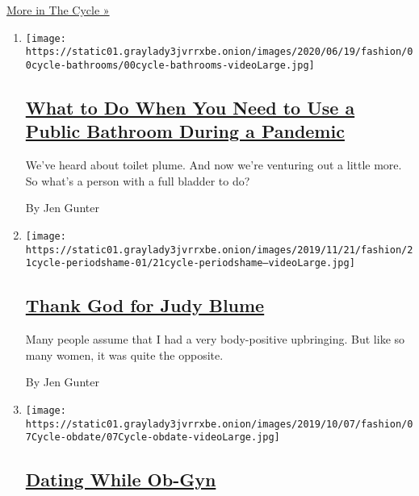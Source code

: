 \href{/column/the-cycle}{More in The Cycle »}

\begin{enumerate}
\def\labelenumi{\arabic{enumi}.}
\item
  \texttt{[image: https://static01.graylady3jvrrxbe.onion/images/2020/06/19/fashion/00cycle-bathrooms/00cycle-bathrooms-videoLarge.jpg]}

  \hypertarget{what-to-do-when-you-need-to-use-a-public-bathroom-during-a-pandemic}{%
  \subsection{\texorpdfstring{\href{/2020/06/24/style/coronavirus-public-bathrooms.html}{What
  to Do When You Need to Use a Public Bathroom During a
  Pandemic}}{What to Do When You Need to Use a Public Bathroom During a Pandemic}}\label{what-to-do-when-you-need-to-use-a-public-bathroom-during-a-pandemic}}

  We've heard about toilet plume. And now we're venturing out a little
  more. So what's a person with a full bladder to do?

  By Jen Gunter
\item
  \texttt{[image: https://static01.graylady3jvrrxbe.onion/images/2019/11/21/fashion/21cycle-periodshame-01/21cycle-periodshame--videoLarge.jpg]}

  \hypertarget{thank-god-for-judy-blume}{%
  \subsection{\texorpdfstring{\href{/2019/11/21/style/menstrual-diarrhea-happens.html}{Thank
  God for Judy
  Blume}}{Thank God for Judy Blume}}\label{thank-god-for-judy-blume}}

  Many people assume that I had a very body-positive upbringing. But
  like so many women, it was quite the opposite.

  By Jen Gunter
\item
  \texttt{[image: https://static01.graylady3jvrrxbe.onion/images/2019/10/07/fashion/07Cycle-obdate/07Cycle-obdate-videoLarge.jpg]}

  \hypertarget{dating-while-ob-gyn}{%
  \subsection{\texorpdfstring{\href{/2019/10/08/style/dating-while-ob-gyn.html}{Dating
  While Ob-Gyn}}{Dating While Ob-Gyn}}\label{dating-while-ob-gyn}}


\end{enumerate}
